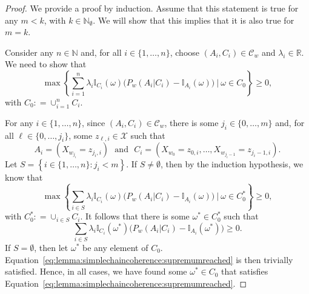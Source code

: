 \documentclass[10pt,a4paper]{paper}
\theoremstyle{definition}
\newcommand{\nats}{\mathbb{N}}
\newcommand{\reals}{\mathbb{R}}
\newcommand{\states}{\mathcal{X}}
\newcommand{\ind}[1]{\mathbb{I}_{#1}}
\newcommand{\coloneqq}{:\!=}
\begin{document}
\begin{proof}
We provide a proof by induction. Assume that this statement is true for any $m<k$, with $k\in\nats_\emptyset$. We will show that this implies that it is also true for $m=k$.

Consider any $n\in\nats$ and, for all $i\in\{1,\dots,n\}$, choose $(A_i,C_i)\in\mathcal{C}_w$ and $\lambda_i\in\reals$. We need to show that
\begin{equation}\label{eq:lemma:simplechaincoherence:TB}
\max\left\{\sum_{i=1}^n\lambda_i\ind{C_i}(\omega)\bigl(P_w(A_i\vert C_i)-\ind{A_i}(\omega)\bigr)~\Bigg\vert~\omega\in C_0\right\}\geq0,
\end{equation}
with $C_0\coloneqq\cup_{i=1}^nC_i$. %

For any $i\in\{1,\dots,n\}$, since $(A_i,C_i)\in\mathcal{C}_w$, there is some $j_i\in\{0,\dots,m\}$ and, for all $\ell\in\{0,\dots,j_i\}$, some $z_{\ell,i}\in\states$ such that
\begin{equation*}
A_i=(X_{w_{j_i}}=z_{j_i,i})
\text{~~and~~}
C_i=(X_{w_{0}}=z_{0,i}, \dots, X_{w_{j_i-1}}=z_{j_i-1,i}).
\end{equation*}
Let $S=\left\{i\in\{1,\dots,n\}\colon j_i<m\right\}$. If $S\neq\emptyset$, then by the induction hypothesis, we know that
\begin{equation*}
\max\left\{\sum_{i\in S}\lambda_i\ind{C_i}(\omega)\bigl(P_w(A_i\vert C_i)-\ind{A_i}(\omega)\bigr)~\Bigg\vert~\omega\in C_0^*\right\}\geq0,
\end{equation*}
with $C_0^*\coloneqq\cup_{i\in S}C_i$. It follows that there is some $\omega^*\in C_0^*$ such that
\begin{equation}\label{eq:lemma:simplechaincoherence:supremumreached}
\sum_{i\in S}\lambda_i\ind{C_i}(\omega^*)\bigl(P_w(A_i\vert C_i)-\ind{A_i}(\omega^*)\bigr)\geq0.
\end{equation}
If $S=\emptyset$, then let $\omega^*$ be any element of $C_0$. Equation~\eqref{eq:lemma:simplechaincoherence:supremumreached} is then trivially satisfied. Hence, in all cases, we have found some $\omega^*\in C_0$ that satisfies Equation~\eqref{eq:lemma:simplechaincoherence:supremumreached}.



\end{proof}
\end{document}
